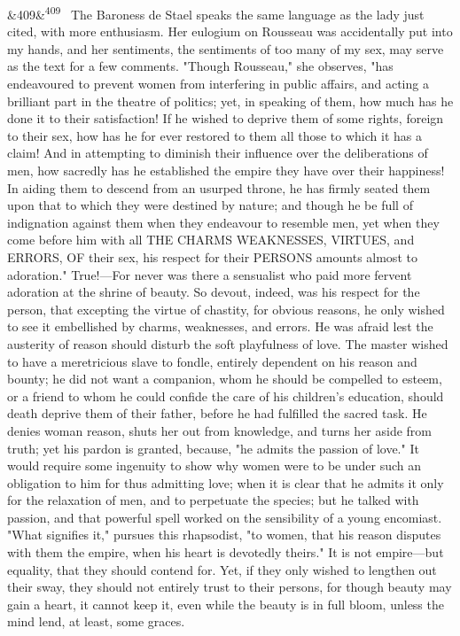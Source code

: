 \documentclass[12pt]{article}
\newcommand{\para}[1][]{\par\noindent\ifx&#1&\else\textsuperscript{\footnotesize #1}~\fi}
\begin{document}
\para[409] The Baroness de Stael speaks the same language as the lady just cited, with more enthusiasm. Her eulogium on Rousseau was accidentally put into my hands, and her sentiments, the sentiments of too many of my sex, may serve as the text for a few comments. "Though Rousseau," she observes, "has endeavoured to prevent women from interfering in public affairs, and acting a brilliant part in the theatre of politics; yet, in speaking of them, how much has he done it to their satisfaction! If he wished to deprive them of some rights, foreign to their sex, how has he for ever restored to them all those to which it has a claim! And in attempting to diminish their influence over the deliberations of men, how sacredly has he established the empire they have over their happiness! In aiding them to descend from an usurped throne, he has firmly seated them upon that to which they were destined by nature; and though he be full of indignation against them when they endeavour to resemble men, yet when they come before him with all THE CHARMS WEAKNESSES, VIRTUES, and ERRORS, OF their sex, his respect for their PERSONS amounts almost to adoration." True!---For never was there a sensualist who paid more fervent adoration at the shrine of beauty. So devout, indeed, was his respect for the person, that excepting the virtue of chastity, for obvious reasons, he only wished to see it embellished by charms, weaknesses, and errors. He was afraid lest the austerity of reason should disturb the soft playfulness of love. The master wished to have a meretricious slave to fondle, entirely dependent on his reason and bounty; he did not want a companion, whom he should be compelled to esteem, or a friend to whom he could confide the care of his children's education, should death deprive them of their father, before he had fulfilled the sacred task. He denies woman reason, shuts her out from knowledge, and turns her aside from truth; yet his pardon is granted, because, "he admits the passion of love." It would require some ingenuity to show why women were to be under such an obligation to him for thus admitting love; when it is clear that he admits it only for the relaxation of men, and to perpetuate the species; but he talked with passion, and that powerful spell worked on the sensibility of a young encomiast. "What signifies it," pursues this rhapsodist, "to women, that his reason disputes with them the empire, when his heart is devotedly theirs." It is not empire---but equality, that they should contend for. Yet, if they only wished to lengthen out their sway, they should not entirely trust to their persons, for though beauty may gain a heart, it cannot keep it, even while the beauty is in full bloom, unless the mind lend, at least, some graces.
\end{document}
